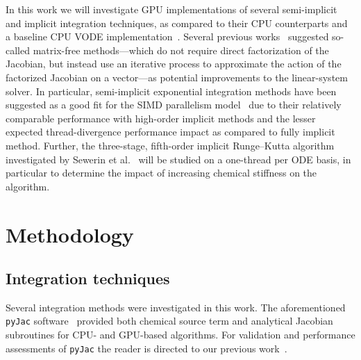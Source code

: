 \documentclass[preprint]{elsarticle}
\begin{document}
In this work we will investigate GPU implementations of several semi-implicit and implicit integration techniques, as compared to their CPU counterparts and a baseline CPU VODE implementation~\cite{Hindmarsh:2005hg}.
Several previous works~\cite{Stone:2013aa,Bisetti:2012jw,Niemeyer:2014aa,Perini20141180,McNenly2015581} suggested so-called matrix-free methods---which do not require direct factorization of the Jacobian, but instead use an iterative process to approximate the action of the factorized Jacobian on a vector---as potential improvements to the linear-system solver.
In particular, semi-implicit exponential integration methods have been suggested as a good fit for the SIMD parallelism model~\cite{Stone:2013aa,Bisetti:2012jw,Niemeyer:2014aa} due to their relatively comparable performance with high-order implicit methods and the lesser expected thread-divergence performance impact as compared to fully implicit method.
Further, the three-stage, fifth-order implicit Runge--Kutta algorithm~\cite{hairer1996solving} investigated by Sewerin et al.~\cite{Sewerin20151375} will be studied on a one-thread per ODE basis, in particular to determine the impact of increasing chemical stiffness on the algorithm.

\section{Methodology}
\label{sec:Method}


\subsection{Integration techniques}

Several integration methods were investigated in this work.
The aforementioned \texttt{pyJac} software~\cite{Niemeyer:2015im} provided both chemical source term and analytical Jacobian subroutines for CPU- and GPU-based algorithms.
For validation and performance assessments of \texttt{pyJac} the reader is directed to our previous work~\cite{Niemeyer:2015ws}.
\end{document}
